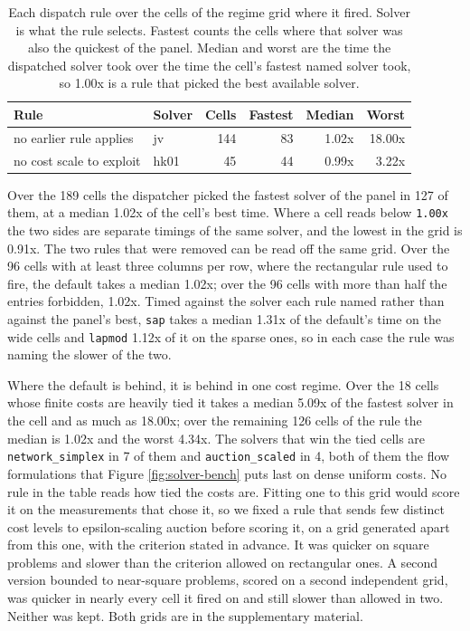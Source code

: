 \begin{table}

\caption{\label{tab:regimes}Each dispatch rule over the cells of the regime grid where it fired. Solver is what the rule selects. Fastest counts the cells where that solver was also the quickest of the panel. Median and worst are the time the dispatched solver took over the time the cell's fastest named solver took, so 1.00x is a rule that picked the best available solver.}
\centering
\begin{tabular}[t]{llrrrr}
\toprule
Rule & Solver & Cells & Fastest & Median & Worst\\
\midrule
no earlier rule applies & jv & 144 & 83 & 1.02x & 18.00x\\
no cost scale to exploit & hk01 & 45 & 44 & 0.99x & 3.22x\\
\bottomrule
\end{tabular}
\end{table}

Over the 189 cells the dispatcher picked the fastest solver of the
panel in 127 of them, at a median 1.02x of the
cell's best time. Where a cell reads below \texttt{1.00x} the two sides are separate
timings of the same solver, and the lowest in the grid is
0.91x. The two rules that were
removed can be read off the same grid. Over the 96 cells with
at least three columns per row, where the rectangular rule used to fire, the
default takes a median
1.02x; over the 96 cells with more than
half the entries forbidden, 1.02x. Timed against the
solver each rule named rather than against the panel's best, \texttt{sap} takes a
median 1.31x of the default's time on the wide cells and \texttt{lapmod}
1.12x of it on the sparse ones, so in each case the rule was naming the
slower of the two.

Where the default is behind, it is behind in one cost regime. Over the
18 cells whose finite costs are heavily tied it takes a median
5.09x of the fastest solver in the cell and as much as
18.00x; over the remaining 126 cells of the
rule the median is 1.02x and the worst
4.34x. The solvers that win the tied cells are
\texttt{network\_simplex} in 7 of them and
\texttt{auction\_scaled} in 4, both of them the
flow formulations that Figure \ref{fig:solver-bench} puts last on dense uniform
costs. No rule in the table reads how tied the costs are. Fitting one to this
grid would score it on the measurements that chose it, so we fixed a rule that
sends few distinct cost levels to epsilon-scaling auction before scoring it, on
a grid generated apart from this one, with the criterion stated in advance. It
was quicker on square problems and slower than the criterion allowed on
rectangular ones. A second version bounded to near-square problems, scored on a
second independent grid, was quicker in nearly every cell it fired on and still
slower than allowed in two. Neither was kept. Both grids are in the
supplementary material.

